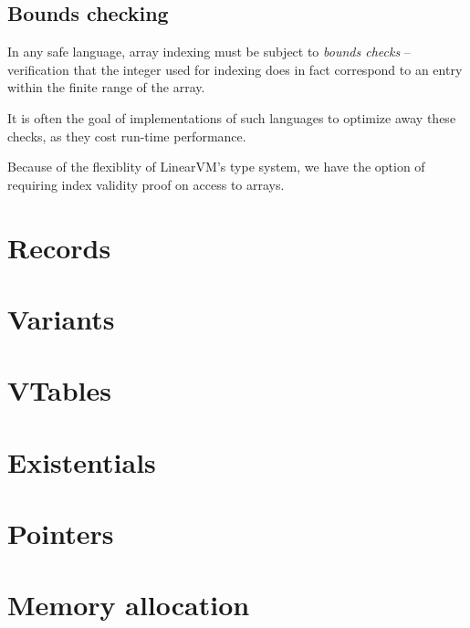 \documentclass[a4paper]{book}
\begin{document}
\section{Bounds checking}
In any safe language, array indexing must be subject to \emph{bounds checks}
-- verification that the integer used for indexing does in fact correspond to
an entry within the finite range of the array.

It is often the goal of implementations of such languages to optimize
away these checks, as they cost run-time performance.

Because of the flexiblity of LinearVM's type system, we have the option
of requiring index validity proof on access to arrays.


\chapter{Records}

\chapter{Variants}
\chapter{VTables}
\chapter{Existentials}

\chapter{Pointers}

\chapter{Memory allocation}
\end{document}
